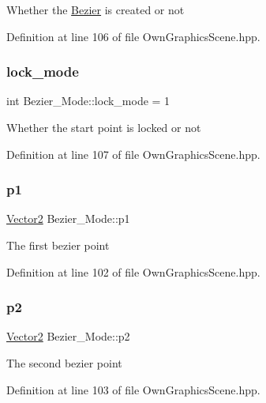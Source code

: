 Whether the \mbox{\hyperlink{classBezier}{Bezier}} is created or not 

Definition at line 106 of file Own\+Graphics\+Scene.\+hpp.

\mbox{\label{structBezier__Mode_afdb33ea2b7dc22c264580b86e5e9e998}} 
\subsubsection{\texorpdfstring{lock\+\_\+mode}{lock\_mode}}
{\footnotesize\ttfamily int Bezier\+\_\+\+Mode\+::lock\+\_\+mode = 1}

Whether the start point is locked or not 

Definition at line 107 of file Own\+Graphics\+Scene.\+hpp.

\mbox{\label{structBezier__Mode_a2d7c5ccccb03114fd1b26a20843a59e4}} 
\subsubsection{\texorpdfstring{p1}{p1}}
{\footnotesize\ttfamily \mbox{\hyperlink{classVector2}{Vector2}} Bezier\+\_\+\+Mode\+::p1}

The first bezier point 

Definition at line 102 of file Own\+Graphics\+Scene.\+hpp.

\mbox{\label{structBezier__Mode_a96ed0f4076e540e5a8789f25f9bf65e9}} 
\subsubsection{\texorpdfstring{p2}{p2}}
{\footnotesize\ttfamily \mbox{\hyperlink{classVector2}{Vector2}} Bezier\+\_\+\+Mode\+::p2}

The second bezier point 

Definition at line 103 of file Own\+Graphics\+Scene.\+hpp.

\mbox{\label{structBezier__Mode_ad9fbff84a5248923ceb29433dc58f49b}} 
